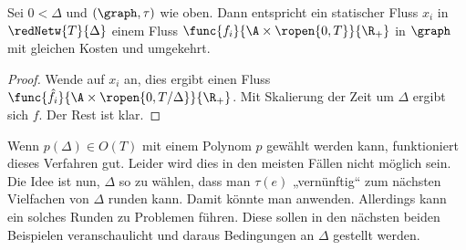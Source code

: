 \begin{lemma}\label{lem:reduced_static_dyn_conv}
    Sei $0 < \Delta$ und $(\graph, \tau)$ wie oben. Dann entspricht ein statischer
    Fluss $x_i$ in $\redNetw{T}{\Delta}$ einem Fluss
    $\func{f_i}{\A \times \ropen{0, T}}{\R_+}$ in $\graph$ mit gleichen Kosten
    und umgekehrt.
    
    \begin{proof}
        Wende  auf $x_i$ an, dies ergibt einen Fluss
        $\func{\hat{f}_i}{\A \times \ropen{0, T/\Delta}}{\R_+}$. Mit Skalierung der
        Zeit um $\Delta$ ergibt sich $f$. Der Rest ist klar.
    \end{proof}
\end{lemma}

Wenn $p(\Delta) \in O(T)$ mit einem Polynom $p$ gewählt werden kann, funktioniert
dieses Verfahren gut. Leider wird dies in den meisten Fällen nicht möglich sein.
Die Idee ist nun, $\Delta$ so zu wählen, dass man $\tau(e)$ „vernünftig“ zum
nächsten Vielfachen von $\Delta$ runden kann. Damit könnte man
 anwenden. Allerdings kann ein solches
Runden zu Problemen führen. Diese sollen in den nächsten beiden Beispielen
veranschaulicht und daraus Bedingungen an $\Delta$ gestellt werden.

